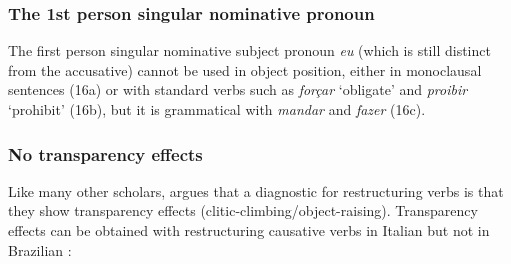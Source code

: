 \documentclass[output=paper]{langsci/langscibook}
\begin{document}
\subsubsection{The 1st person singular nominative pronoun}%

The first person singular nominative subject pronoun \textit{eu} (which is still distinct from the accusative) cannot be used in object position, either in monoclausal sentences (16a) or with standard  verbs such as \textit{forçar} ‘obligate’ and \textit{proibir} ‘prohibit’ (16b), but it is grammatical with \textit{mandar} and \textit{fazer} (16c). 

\ea%
    \label{ex:moreno:16}
    \z
\z

\subsubsection{No transparency effects}%

Like many other scholars, \citet{Cinque2004} argues that a diagnostic for restructuring verbs is that they show transparency effects (clitic-climbing\slash object-raising). Transparency effects can be obtained with restructuring causative verbs in Italian but not in Brazilian :

\ea%
    \label{ex:moreno:17}
    \z
\z
\end{document}
